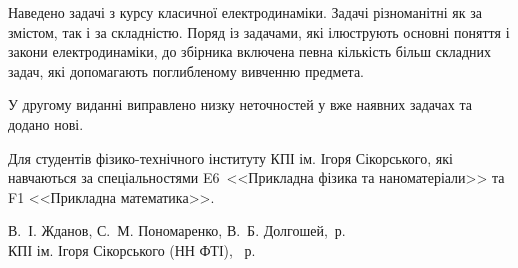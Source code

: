 {\begin{alwayssingle}
		Наведено  задачі з курсу класичної електродинаміки.  Задачі різноманітні як за змістом, так і за складністю. Поряд із задачами, які ілюструють основні поняття і закони електродинаміки, до збірника включена певна кількість більш складних задач, які допомагають поглибленому вивченню предмета.

        У другому виданні виправлено низку неточностей у вже наявних задачах та додано нові.

		Для студентів фізико-технічного інституту КПІ ім. Ігоря Сікорського, які навчаються за спеціальностями E6~<<Прикладна фізика та наноматеріали>> та F1 <<Прикладна математика>>.

		\vfill

	\hfill
	\begin{minipage}[t]{0.65\linewidth}\small
        \textcopyright{} В.~І. Жданов, С.~М. Пономаренко, В.~Б. Долгошей, \the\year\,р. \\
        \textcopyright{}  КПІ ім. Ігоря Сікорського (НН ФТІ), \the\year~р.
    \end{minipage}
		\newpage%
	\end{alwayssingle}
}

